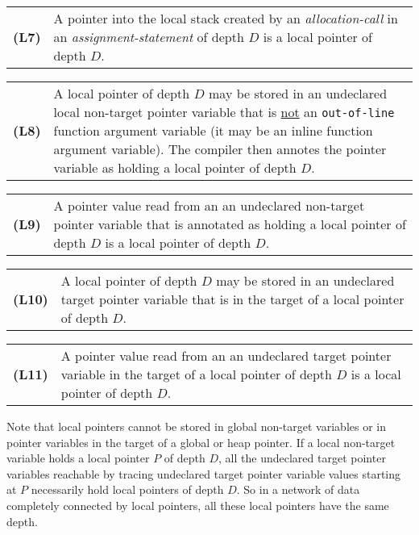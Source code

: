 \documentclass[12pt]{article}
\newcommand{\key}[1]{{\rm \bfseries #1}}
\newenvironment{indpar}[1][0.3in]%
	{\begin{list}{}%
		     {\setlength{\itemsep}{0in}%
		      \setlength{\topsep}{0in}%
		      \setlength{\parsep}{1ex}%
		      \setlength{\labelwidth}{#1}%
		      \setlength{\leftmargin}{#1}%
		      \addtolength{\leftmargin}{\labelsep}}%
	 \item}%
	{\end{list}}
\begin{document}
\begin{indpar}[0.2in]

\begin{tabular}{p{0.5in}p{5.0in}}
\key{(L7)}	& A pointer into the local stack
		  created by an {\em allocation-call}
		  in an {\em assignment-statement} of depth $D$
		  is a local pointer of depth $D$.
\end{tabular}

\begin{tabular}{p{0.5in}p{5.0in}}
\key{(L8)}	& A local pointer of depth $D$ may be stored in
		  an undeclared local non-target pointer variable
		  that is \underline{not} an {\tt out-of-line}
		  function argument variable (it may be an inline
		  function argument variable).  The compiler
		  then annotes the pointer variable as holding a local
		  pointer of depth $D$.
\end{tabular}

\begin{tabular}{p{0.5in}p{5.0in}}
\key{(L9)}	& A pointer value read from an
		  an undeclared non-target pointer variable
		  that is annotated as holding a local pointer of depth $D$
		  is a local pointer of depth $D$.
\end{tabular}

\begin{tabular}{p{0.5in}p{5.0in}}
\key{(L10)}	& A local pointer of depth $D$ may be stored in
		  an undeclared target pointer variable
		  that is in the target of a
		  local pointer of depth $D$.
\end{tabular}

\begin{tabular}{p{0.5in}p{5.0in}}
\key{(L11)}	& A pointer value read from an
		  an undeclared target pointer variable
		  in the target of a local pointer of depth $D$
		  is a local pointer of depth $D$.
\end{tabular}

\end{indpar}

Note that local pointers cannot be stored in global non-target variables
or in pointer variables in the target of a global or heap pointer.
If a local non-target variable holds a local pointer $P$ of depth $D$,
all the undeclared target pointer variables reachable by tracing
undeclared target pointer variable values starting at $P$ necessarily hold
local pointers of depth $D$.  So in a network of
data completely connected by local pointers, all these local pointers
have the same depth.
\end{document}
